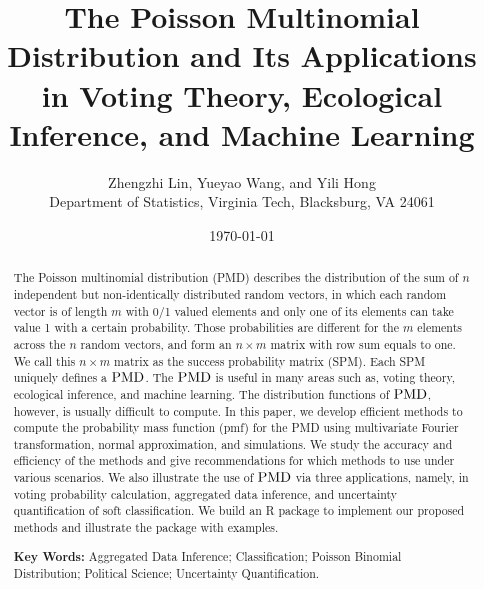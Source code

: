 \documentclass[12pt]{article}
\newcommand{\PMD}{{\normalfont\textrm{PMD}}}
\begin{document}


\title{The Poisson Multinomial Distribution and Its Applications in Voting Theory, Ecological Inference, and Machine Learning}


\author{
Zhengzhi Lin, Yueyao Wang, and Yili Hong\\[1.5ex]
{Department of Statistics, Virginia Tech, Blacksburg, VA 24061}
}
	
\date{\today}
	
\maketitle
\begin{abstract}
The Poisson multinomial distribution (PMD) describes the distribution of the sum of $n$ independent but non-identically distributed random vectors, in which each random vector is of length $m$ with 0/1 valued elements and only one of its elements can take value 1 with a certain probability. Those probabilities are different for the $m$ elements across the $n$ random vectors, and form an $n \times m$ matrix with row sum equals to one. We call this $n\times m$ matrix as the success probability matrix (SPM). Each SPM uniquely defines a $\PMD$. The $\PMD$ is useful in many areas such as, voting theory, ecological inference, and machine learning. The distribution functions of $\PMD$, however, is usually difficult to compute. In this paper, we develop efficient methods to compute the probability mass function (pmf) for the PMD using multivariate Fourier transformation, normal approximation, and simulations. We study the accuracy and efficiency of the methods and give recommendations for which methods to use under various scenarios. We also illustrate the use of $\PMD$ via three applications, namely, in voting probability calculation, aggregated data inference, and uncertainty quantification of soft classification. We build an R package to implement our proposed methods and illustrate the package with examples.

\textbf{Key Words:} Aggregated Data Inference; Classification; Poisson Binomial Distribution; Political Science; Uncertainty Quantification.
\end{abstract}
	
\end{document}
